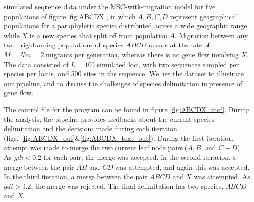 \documentclass{article1}
\begin{document}
\citet{Leache2019} simulated sequence data under the MSC-with-migration model for five
populations of figure \ref{fig:ABCDX}, in which $A, B, C, D$ represent geographical
populations for a paraphyletic species distributed across a wide geographic range while
$X$ is a new species that split off from population $A$. Migration between any two
neighbouring populations of species $ABCD$ occurs at the rate of $M = Nm = 2$ migrants
per generation, whereas there is no gene flow involving $X$.  The data consisted of
$L=100$ simulated loci, with two sequences sampled per species per locus, and 500 sites
in the sequence.  We use the dataset to illustrate our pipeline, and to discuss the
challenges of species delimitation in presence of gene flow.

The control file for the program can be found in figure \ref{fig:ABCDX_mcf}.  During the
analysis, the pipeline provides feedbacks about the current species delimitation and the
decisions made during each iteration
(figs.~\ref{fig:ABCDX_out}\&\ref{fig:ABCDX_text_out}).  During the first iteration,
attempt was made to merge the two current leaf node pairs ($A,B$, and $C-D$).  As $gdi
<0.2$ for each pair, the merge was accepted.  In the second iteration, a merge between
the pair $AB$ and $CD$ was attempted, and again this was accepted.  In the third
iteration, a merge between the pair $ABCD$ and $X$ was attempted.  As $gdi > 0.2$, the
merge was rejected.  The final delimitation has two species, $ABCD$ and $X$.
\end{document}
